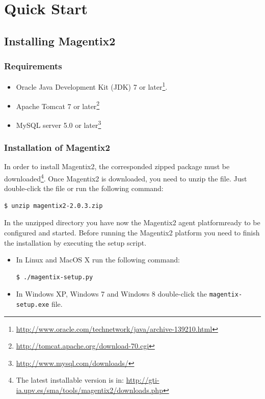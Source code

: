 \chapter{Quick Start} \label{chap:quickstart}
\section{Installing Magentix2} %
\subsection{Requirements}
\begin{itemize}
\item Oracle Java Development Kit (JDK) 7 or later\footnote{\url{http://www.oracle.com/technetwork/java/archive-139210.html}}. %
\item Apache Tomcat 7 or later\footnote{\url{http://tomcat.apache.org/download-70.cgi}}
\item MySQL server 5.0 or later\footnote{\url{http://www.mysql.com/downloads/}}
\end{itemize}


\subsection{Installation of Magentix2}

In order to install Magentix2,  the corresponded zipped package must be downloaded\footnote{The latest installable version is in: \url{http://gti-ia.upv.es/sma/tools/magentix2/downloads.php}}. Once Magentix2 is downloaded, you need to unzip the file. Just double-click the file or run the following command:

\begin{verbatim}
$ unzip magentix2-2.0.3.zip
\end{verbatim}

In the unzipped directory you have now the Magentix2 agent platform\texttrademark ready to be configured and started. Before running the Magentix2 platform you need to finish the installation by executing the setup script.
\begin{itemize}
    \item In Linux and MacOS X run the following command:
        \begin{verbatim}
$ ./magentix-setup.py
        \end{verbatim}
    \item In Windows XP, Windows 7 and Windows 8 double-click the \texttt{magentix-setup.exe} file.
\end{itemize}


